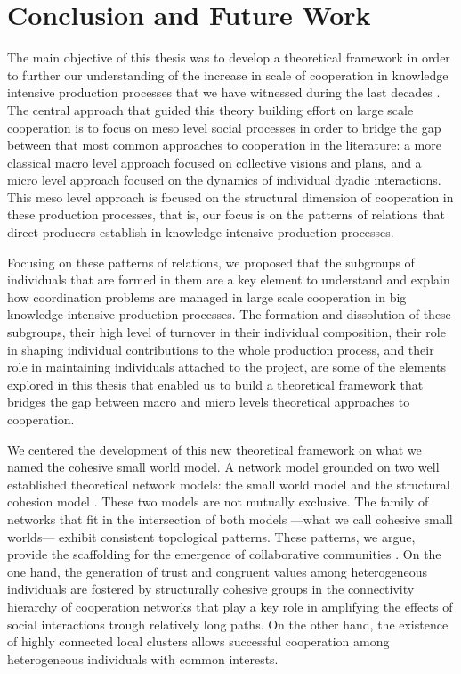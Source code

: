 \chapter{Conclusion and Future Work}
\label{conclusion}

The main objective of this thesis was to develop a theoretical framework in order to further our understanding of the increase in scale of cooperation in knowledge intensive production processes that we have witnessed during the last decades \citet*{uzzi:2007a}. The central approach that guided this theory building effort on large scale cooperation is to focus on meso level social processes in order to bridge the gap between that most common approaches to cooperation in the literature: a more classical macro level approach focused on collective visions and plans, and a micro level approach focused on the dynamics of individual dyadic interactions. This meso level approach is focused on the structural dimension of cooperation in these production processes, that is, our focus is on the patterns of relations that direct producers establish in knowledge intensive production processes.

Focusing on these patterns of relations, we proposed that the subgroups of individuals that are formed in them are a key element to understand and explain how coordination problems are managed in large scale cooperation in big knowledge intensive production processes. The formation and dissolution of these subgroups, their high level of turnover in their individual composition, their role in shaping individual contributions to the whole production process, and their role in maintaining individuals attached to the project, are some of the elements explored in this thesis that enabled us to build a theoretical framework that bridges the gap between macro and micro levels theoretical approaches to cooperation.

We centered the development of this new theoretical framework on what we named the cohesive small world model. A network model grounded on two well established theoretical network models: the small world model \citep{watts:1998} and the structural cohesion model \citep{white:2001, moody:2003}. These two models are not mutually exclusive. The family of networks that fit in the intersection of both models ---what we call cohesive small worlds--- exhibit consistent topological patterns. These patterns, we argue, provide the scaffolding for the emergence of collaborative communities \citep{adler: 2006}. On the one hand, the generation of trust and congruent values among heterogeneous individuals are fostered by structurally cohesive groups in the connectivity hierarchy of cooperation networks that play a key role in amplifying the effects of social interactions trough relatively long paths. On the other hand, the existence of highly connected local clusters allows successful cooperation among heterogeneous individuals with common interests.

